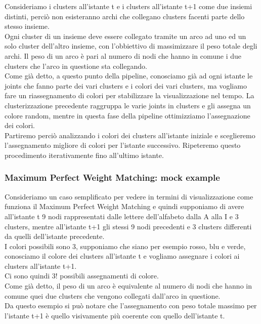 Consideriamo i clusters all'istante t e i clusters all'istante t+1 come due insiemi distinti, perciò non esisteranno archi che collegano clusters facenti parte dello stesso insieme. \\
Ogni cluster di un insieme deve essere collegato tramite un arco ad uno ed un solo cluster dell'altro insieme, con l'obbiettivo di massimizzare il peso totale degli archi.
Il peso di un arco è pari al numero di nodi che hanno in comune i due clusters che l'arco in questione sta collegando. \\
Come già detto, a questo punto della pipeline, conosciamo già ad ogni istante le joints che fanno parte dei vari clusters e i colori dei vari clusters, ma vogliamo fare un riassegnamento di colori per stabilizzare la visualizzazione nel tempo.
La clusterizzazione precedente raggruppa le varie joints in clusters e gli assegna un colore random, mentre in questa fase della pipeline ottimizziamo l'assegnazione dei colori. \\
Partiremo perciò analizzando i colori dei clusters all'istante iniziale e sceglieremo l'assegnamento migliore di colori per l'istante successivo.
Ripeteremo questo procedimento iterativamente fino all'ultimo istante.


\subsubsection{Maximum Perfect Weight Matching: mock example}
Consideriamo un caso semplificato per vedere in termini di visualizzazione come funziona il Maximum Perfect Weight Matching e quindi supponiamo di avere all'istante t 9 nodi rappresentati dalle lettere dell'alfabeto dalla A alla I e 3 clusters, mentre all'istante t+1 gli stessi 9 nodi precedenti e 3 clusters differenti da quelli dell'istante precedente. \\
I colori possibili sono 3, supponiamo che siano per esempio rosso, blu e verde, conosciamo il colore dei clusters all'istante t e vogliamo assegnare i colori ai clusters all'istante t+1.\\
Ci sono quindi 3! possibili assegnamenti di colore. \\
Come già detto, il peso di un arco è equivalente al numero di nodi che hanno in comune quei due clusters che vengono collegati dall'arco in questione. \\
Da questo esempio si può notare che l'assegnamento con peso totale massimo per l'istante t+1 è quello visivamente più coerente con quello dell'istante t.

